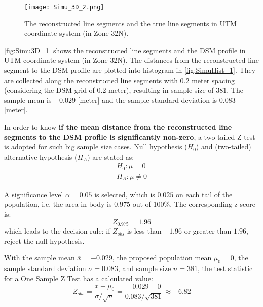 \begin{figure}
  \centering
  \texttt{[image: Simu\_3D\_2.png]} %
  \caption{\small The reconstructed line segments and the true line segments in UTM coordinate system (in Zone 32N).}
  \label{fig:Simu3D_2}
\end{figure}

\clearpage

\cref{fig:Simu3D_1} shows the reconstructed line segments and the DSM profile in UTM coordinate system (in Zone 32N). The distances from the reconstructed line segment to the DSM profile are plotted into histogram in \cref{fig:SimuHist_1}. They are collected along the reconstructed line segments with 0.2 meter spacing (considering the DSM grid of 0.2 meter), resulting in sample size of $381$. The sample mean is $-0.029$ [meter] and the sample standard deviation is $0.083$ [meter]. %

In order to know \textbf{if the mean distance from the reconstructed line segments to the DSM profile is significantly non-zero}, a two-tailed Z-test is adopted for such big sample size cases. Null hypothesis ($H_0$) and (two-tailed) alternative hypothesis ($H_A$) are stated as:
\begin{equation*}
\begin{split}
H_0: \mu=0\\
H_A: \mu\neq0
\end{split}
\end{equation*}

A significance level $\alpha=0.05$ is selected, which is $0.025$ on each tail of the population, i.e. the area in body is $0.975$ out of 100\%. The corresponding z-score is:
\begin{equation*}
Z_{0.975}=1.96
\end{equation*}
which leads to the decision rule: if $Z_{obs}$ is less than $-1.96$ or greater than $1.96$, reject the null hypothesis.

With the sample mean $\overline{x}=-0.029$,
the proposed population mean $\mu_0=0$,
the sample standard deviation $\sigma=0.083$,
and sample size $n=381$, the test statistic for a One Sample Z Test has a calculated value:
\begin{equation*}
Z_{obs} = \frac{\overline{x}-\mu_0}{\sigma/\sqrt{n}}=\frac{-0.029-0}{0.083/\sqrt{381}}\approx-6.82
\end{equation*}

